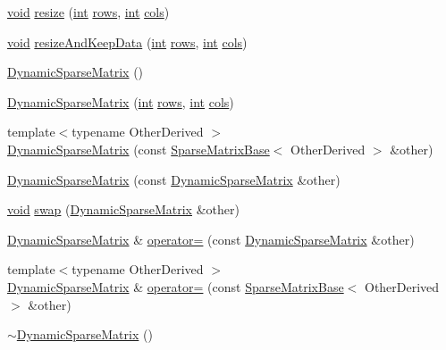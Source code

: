 \begin{DoxyCompactItemize}
\item 
\hyperlink{group___u_a_v_objects_plugin_ga444cf2ff3f0ecbe028adce838d373f5c}{void} \hyperlink{class_dynamic_sparse_matrix_af6c52ce9553e5a568c8f9de0ed80d392}{resize} (\hyperlink{ioapi_8h_a787fa3cf048117ba7123753c1e74fcd6}{int} \hyperlink{class_dynamic_sparse_matrix_abe44ef949173f825ff346e096bb074a4}{rows}, \hyperlink{ioapi_8h_a787fa3cf048117ba7123753c1e74fcd6}{int} \hyperlink{class_dynamic_sparse_matrix_a227b1cc3a3e46b5483a9d8881300c3a1}{cols})
\item 
\hyperlink{group___u_a_v_objects_plugin_ga444cf2ff3f0ecbe028adce838d373f5c}{void} \hyperlink{class_dynamic_sparse_matrix_a79d2728e4eeeda5cc62c8c58a71b1434}{resize\-And\-Keep\-Data} (\hyperlink{ioapi_8h_a787fa3cf048117ba7123753c1e74fcd6}{int} \hyperlink{class_dynamic_sparse_matrix_abe44ef949173f825ff346e096bb074a4}{rows}, \hyperlink{ioapi_8h_a787fa3cf048117ba7123753c1e74fcd6}{int} \hyperlink{class_dynamic_sparse_matrix_a227b1cc3a3e46b5483a9d8881300c3a1}{cols})
\item 
\hyperlink{class_dynamic_sparse_matrix_a943fafa8bda9f970eed02bc9c849c473}{Dynamic\-Sparse\-Matrix} ()
\item 
\hyperlink{class_dynamic_sparse_matrix_a890f3a2e7d7b3aa4bdfda5c32be3b63c}{Dynamic\-Sparse\-Matrix} (\hyperlink{ioapi_8h_a787fa3cf048117ba7123753c1e74fcd6}{int} \hyperlink{class_dynamic_sparse_matrix_abe44ef949173f825ff346e096bb074a4}{rows}, \hyperlink{ioapi_8h_a787fa3cf048117ba7123753c1e74fcd6}{int} \hyperlink{class_dynamic_sparse_matrix_a227b1cc3a3e46b5483a9d8881300c3a1}{cols})
\item 
{\footnotesize template$<$typename Other\-Derived $>$ }\\\hyperlink{class_dynamic_sparse_matrix_ae42748dc572facd328c8475d951a2af2}{Dynamic\-Sparse\-Matrix} (const \hyperlink{class_sparse_matrix_base}{Sparse\-Matrix\-Base}$<$ Other\-Derived $>$ \&other)
\item 
\hyperlink{class_dynamic_sparse_matrix_a4f5b6a48565dd7f17d2c5b412f4e0307}{Dynamic\-Sparse\-Matrix} (const \hyperlink{class_dynamic_sparse_matrix}{Dynamic\-Sparse\-Matrix} \&other)
\item 
\hyperlink{group___u_a_v_objects_plugin_ga444cf2ff3f0ecbe028adce838d373f5c}{void} \hyperlink{class_dynamic_sparse_matrix_a91e44a8bb1e4586ebd549c297c2dfb06}{swap} (\hyperlink{class_dynamic_sparse_matrix}{Dynamic\-Sparse\-Matrix} \&other)
\item 
\hyperlink{class_dynamic_sparse_matrix}{Dynamic\-Sparse\-Matrix} \& \hyperlink{class_dynamic_sparse_matrix_a883a384db19cb797d3bb83665297b75e}{operator=} (const \hyperlink{class_dynamic_sparse_matrix}{Dynamic\-Sparse\-Matrix} \&other)
\item 
{\footnotesize template$<$typename Other\-Derived $>$ }\\\hyperlink{class_dynamic_sparse_matrix}{Dynamic\-Sparse\-Matrix} \& \hyperlink{class_dynamic_sparse_matrix_a1feedfed719a0c75ab39ae18afe82e68}{operator=} (const \hyperlink{class_sparse_matrix_base}{Sparse\-Matrix\-Base}$<$ Other\-Derived $>$ \&other)
\item 
\hyperlink{class_dynamic_sparse_matrix_ada45fc90c548b548977e7be90b3a1b0d}{$\sim$\-Dynamic\-Sparse\-Matrix} ()
\end{DoxyCompactItemize}
